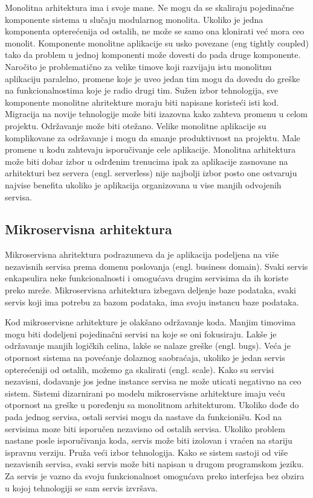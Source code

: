 \documentclass[12pt,oneside]{memoir}
\begin{document}
Monolitna arhitektura ima i svoje mane. Ne mogu da se skaliraju pojedinačne komponente sistema u slučaju modularnog monolita. Ukoliko je jedna komponenta opterećenija od ostalih, ne može se samo ona klonirati već mora ceo monolit. Komponente monolitne aplikacije su usko povezane (eng tightly coupled) tako da problem u jednoj komponenti može dovesti do pada druge komponente. Naročito je problematično za velike timove koji razvijaju istu monolitnu aplikaciju paralelno, promene koje je uveo jedan tim mogu da dovedu do greške na funkcionalnostima koje je radio drugi tim. Sužen izbor tehnologija, sve komponente monolitne ahritekture moraju biti napisane koristeći isti kod. Migracija na novije tehnologije može biti izazovna kako zahteva promenu u celom projektu. Održavanje može biti otežano. Velike monolitne aplikacije su komplikovane za održavanje i mogu da smanje produktivnost na projektu. Male promene u kodu zahtevaju isporučivanje cele aplikacije. Monolitna arhitektura može biti dobar izbor u odrđenim trenucima ipak za aplikacije zasnovane na arhitekturi bez servera (engl. serverless) nije najbolji izbor posto one ostvaruju najvise benefita ukoliko je aplikacija organizovana u vise manjih odvojenih servisa\cite{sa}.

\subsection{Mikroservisna arhitektura}
Mikroservisna ahritektura podrazumeva da je aplikacija podeljena na više nezavisnih servisa prema domenu poslovanja (engl. business domain)\cite{bm}. Svaki servis enkapsulira neke funkcionalnosti i omogućava drugim servisima da ih koriste preko mreže. Mikroservisna arhitektura izbegava deljenje baze podataka, svaki servis koji ima potrebu za bazom podataka, ima svoju instancu baze podataka. 

Kod mikroservisne arhitekture je olakšano održavanje koda. Manjim timovima mogu biti dodeljeni pojedinačni servisi na koje se oni fokusiraju. Lakše je održavanje manjih logičkih celina, lakše se nalaze greške (engl. bugs). Veća je otpornost sistema na povećanje dolaznog saobraćaja, ukoliko je jedan servis opterećeniji od ostalih, možemo ga skalirati (engl. scale). Kako su servisi nezavisni, dodavanje jos jedne instance servisa ne može uticati negativno na ceo sistem. Sistemi dizarnirani po modelu mikroservisne arhitekture imaju veću otpornost na greške u poređenju sa monolitnom arhitekturom. Ukoliko dođe do pada jednog servisa, ostali servisi mogu da nastave da funkcionišu. Kod na servisima moze biti isporučen nezavisno od ostalih servisa. Ukoliko problem nastane posle isporučivanja koda, servis može biti izolovan i vraćen na stariju ispravnu verziju. Pruža veći izbor tehnologija. Kako se sistem sastoji od više nezavisnih servisa, svaki servis može biti napisan u drugom programskom jeziku. Za servis je vazno da svoju funkcionalnost omogućava preko interfejsa bez obzira u kojoj tehnologiji se sam servis izvršava.
\end{document}
